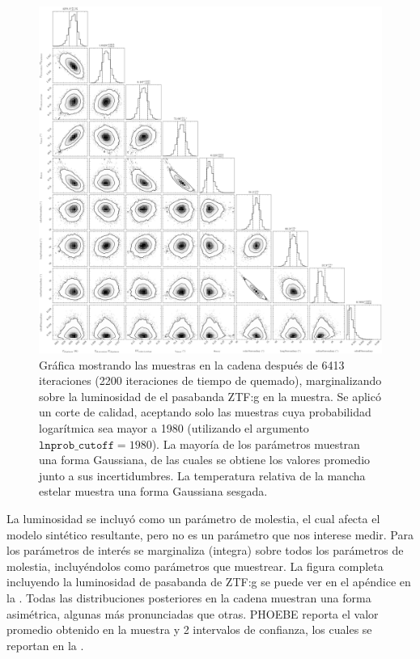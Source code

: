 \begin{figure}[!ht]
	\centering
	\includegraphics[scale=0.29]{Metodologia/Secciones/ModeloComputacional/Figures/Figura MCMC ZTF Resultados.png}
	\caption{Gráfica mostrando las muestras en la cadena después de 6413
	iteraciones (2200 iteraciones de tiempo de quemado), marginalizando sobre la
	luminosidad de el pasabanda ZTF:g en la muestra. Se aplicó un corte de
	calidad, aceptando solo las muestras cuya probabilidad logarítmica sea mayor
	a 1980 (utilizando el argumento $\mathtt{lnprob\_cutoff} = 1980$). La
	mayoría de los parámetros muestran una forma Gaussiana, de las cuales se
	obtiene los valores promedio junto a sus incertidumbres. La temperatura
	relativa de la mancha estelar  muestra una forma Gaussiana
	sesgada.}
	\label{figuraMcmcZtfResultadosPrimarios}
\end{figure}

La luminosidad se incluyó como un parámetro de molestia, el cual afecta el
modelo sintético resultante, pero no es un parámetro que nos interese medir.
Para los parámetros de interés se marginaliza (integra) sobre todos los
parámetros de molestia, incluyéndolos como parámetros que muestrear. La figura
completa incluyendo la luminosidad de pasabanda de ZTF:g se puede ver en el
apéndice en la . Todas las
distribuciones posteriores en la cadena muestran una forma asimétrica, algunas
más pronunciadas que otras. PHOEBE reporta el valor promedio obtenido en la
muestra y 2 intervalos de confianza, los cuales se reportan en la
.

